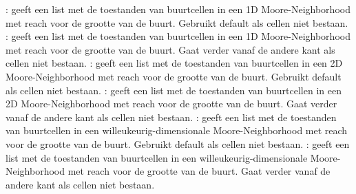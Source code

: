 {}: geeft een list met de toestanden van buurtcellen in een 1D Moore-Neighborhood met reach voor de grootte van de buurt. Gebruikt default als cellen niet bestaan.\markdownRendererInterblockSeparator
{}: geeft een list met de toestanden van buurtcellen in een 1D Moore-Neighborhood met reach voor de grootte van de buurt. Gaat verder vanaf de andere kant als cellen niet bestaan.\markdownRendererInterblockSeparator
{}: geeft een list met de toestanden van buurtcellen in een 2D Moore-Neighborhood met reach voor de grootte van de buurt. Gebruikt default als cellen niet bestaan.\markdownRendererInterblockSeparator
{}: geeft een list met de toestanden van buurtcellen in een 2D Moore-Neighborhood met reach voor de grootte van de buurt. Gaat verder vanaf de andere kant als cellen niet bestaan.\markdownRendererInterblockSeparator
{}: geeft een list met de toestanden van buurtcellen in een willeukeurig-dimensionale Moore-Neighborhood met reach voor de grootte van de buurt. Gebruikt default als cellen niet bestaan.\markdownRendererInterblockSeparator
{}: geeft een list met de toestanden van buurtcellen in een willeukeurig-dimensionale Moore-Neighborhood met reach voor de grootte van de buurt. Gaat verder vanaf de andere kant als cellen niet bestaan.\markdownRendererDocumentEnd